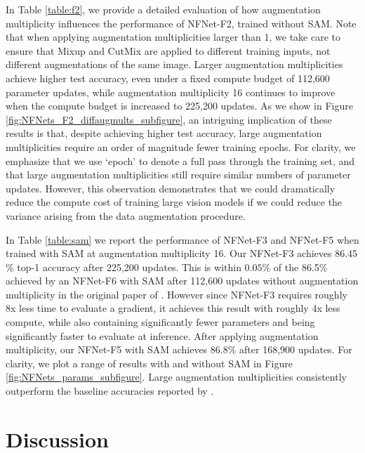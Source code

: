 \documentclass{article}
\begin{document}
In Table \ref{table:f2}, we provide a detailed evaluation of how augmentation multiplicity influences the performance of NFNet-F2, trained without SAM. Note that when applying augmentation multiplicities larger than 1, we take care to ensure that Mixup and CutMix are applied to different training inputs, not different augmentations of the same image. Larger augmentation multiplicities achieve higher test accuracy, even under a fixed compute budget of 112,600 parameter updates, while augmentation multiplicity 16 continues to improve when the compute budget is increased to 225,200 updates. As we show in Figure \ref{fig:NFNets_F2_diffaugmults_subfigure}, an intriguing implication of these results is that, despite achieving higher test accuracy, large augmentation multiplicities require an order of magnitude fewer training epochs. For clarity, we emphasize that we use `epoch' to denote a full pass through the training set, and that large augmentation multiplicities still require similar numbers of parameter updates. However, this observation demonstrates that we could dramatically reduce the compute cost of training large vision models if we could reduce the variance arising from the data augmentation procedure.

In Table \ref{table:sam} we report the performance of NFNet-F3 and NFNet-F5 when trained with SAM \citep{foret2020sharpness} at augmentation multiplicity 16. Our NFNet-F3 achieves 86.45$\%$ top-1 accuracy after 225,200 updates. This is within $0.05\%$ of the 86.5$\%$ achieved by an NFNet-F6 with SAM after 112,600 updates without augmentation multiplicity in the original paper of \citet{brock2021high}. However since NFNet-F3 requires roughly 8x less time to evaluate a gradient, it achieves this result with roughly 4x less compute, while also containing significantly fewer parameters and being significantly faster to evaluate at inference. After applying augmentation multiplicity, our NFNet-F5 with SAM achieves $86.8\%$ after 168,900 updates. For clarity, we plot a range of results with and without SAM in Figure \ref{fig:NFNets_params_subfigure}. Large augmentation multiplicities consistently outperform the baseline accuracies reported by \citet{brock2021high}.





\section{Discussion}
\label{sec:discussion}
\end{document}
